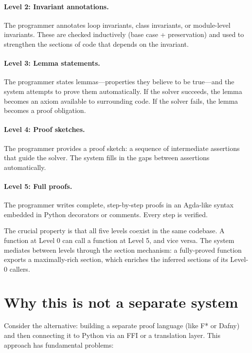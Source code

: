 \documentclass[11pt]{report}
\theoremstyle{definition}
\theoremstyle{plain}
\begin{document}
\paragraph{Level 2: Invariant annotations.}
The programmer annotates loop invariants, class invariants, or module-level
invariants. These are checked inductively (base case + preservation) and used
to strengthen the sections of code that depends on the invariant.

\paragraph{Level 3: Lemma statements.}
The programmer states lemmas---properties they believe to be true---and the
system attempts to prove them automatically. If the solver succeeds, the
lemma becomes an axiom available to surrounding code. If the solver fails,
the lemma becomes a proof obligation.

\paragraph{Level 4: Proof sketches.}
The programmer provides a proof sketch: a sequence of intermediate assertions
that guide the solver. The system fills in the gaps between assertions
automatically.

\paragraph{Level 5: Full proofs.}
The programmer writes complete, step-by-step proofs in an Agda-like syntax
embedded in Python decorators or comments. Every step is verified.

The crucial property is that all five levels coexist in the same codebase.
A function at Level 0 can call a function at Level 5, and vice versa. The
system mediates between levels through the section mechanism: a fully-proved
function exports a maximally-rich section, which enriches the inferred
sections of its Level-0 callers.

\section{Why this is not a separate system}

Consider the alternative: building a separate proof language (like F* or
Dafny) and then connecting it to Python via an FFI or a translation layer.
This approach has fundamental problems:
\end{document}
